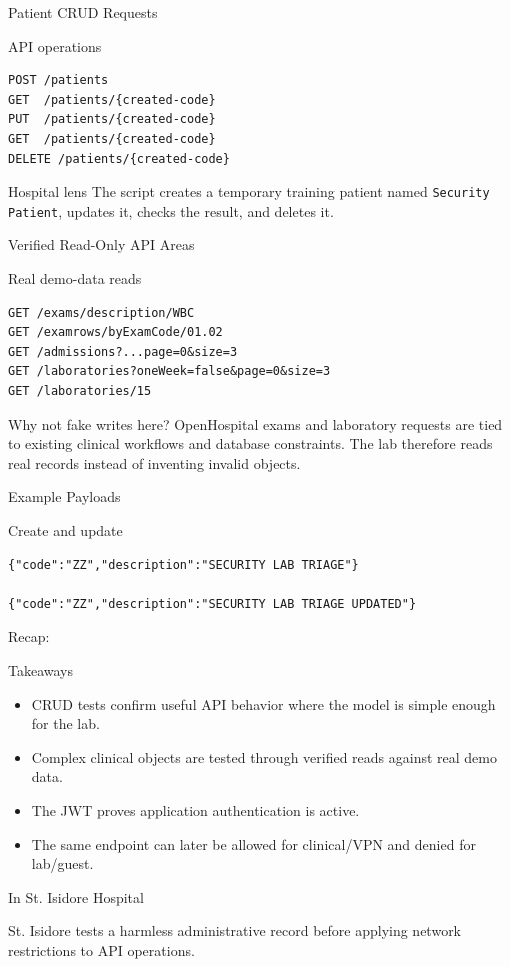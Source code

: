 \documentclass[presentation]{beamer}
\newcommand{\scenario}{St. Isidore Hospital}
\newcommand{\takeawaysframe}[2]{
\begin{frame}[c]{Recap: \insertsection}
\begin{block}{Takeaways}
#1
\end{block}
\begin{exampleblock}{In \scenario}
#2
\end{exampleblock}
\end{frame}
}
\begin{document}
\begin{frame}[fragile,c]{Patient CRUD Requests}
\small
\begin{block}{API operations}
\begin{verbatim}
POST /patients
GET  /patients/{created-code}
PUT  /patients/{created-code}
GET  /patients/{created-code}
DELETE /patients/{created-code}
\end{verbatim}
\end{block}

\begin{exampleblock}{Hospital lens}
The script creates a temporary training patient named \texttt{Security Patient}, updates it, checks
the result, and deletes it.
\end{exampleblock}
\end{frame}

\begin{frame}[fragile,c]{Verified Read-Only API Areas}
\small
\begin{block}{Real demo-data reads}
\begin{verbatim}
GET /exams/description/WBC
GET /examrows/byExamCode/01.02
GET /admissions?...page=0&size=3
GET /laboratories?oneWeek=false&page=0&size=3
GET /laboratories/15
\end{verbatim}
\end{block}

\begin{exampleblock}{Why not fake writes here?}
OpenHospital exams and laboratory requests are tied to existing clinical workflows and database
constraints. The lab therefore reads real records instead of inventing invalid objects.
\end{exampleblock}
\end{frame}

\begin{frame}[fragile,c]{Example Payloads}
\begin{block}{Create and update}
\begin{verbatim}
{"code":"ZZ","description":"SECURITY LAB TRIAGE"}

{"code":"ZZ","description":"SECURITY LAB TRIAGE UPDATED"}
\end{verbatim}
\end{block}
\end{frame}

\takeawaysframe{
\begin{itemize}
    \item CRUD tests confirm useful API behavior where the model is simple enough for the lab.
    \item Complex clinical objects are tested through verified reads against real demo data.
    \item The JWT proves application authentication is active.
    \item The same endpoint can later be allowed for clinical/VPN and denied for lab/guest.
\end{itemize}
}{
St. Isidore tests a harmless administrative record before applying network restrictions to API
operations.
}
\end{document}
